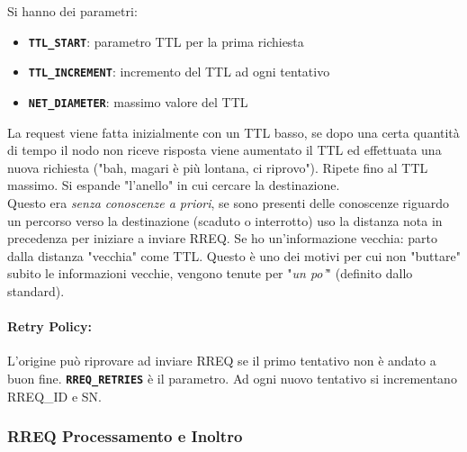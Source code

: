 Si hanno dei parametri:
\begin{itemize}
	\item \textbf{\texttt{TTL\_START}}: parametro TTL per la prima richiesta
	\item \textbf{\texttt{TTL\_INCREMENT}}: incremento del TTL ad ogni tentativo
	\item \texttt{\textbf{NET\_DIAMETER}}: massimo valore del TTL
\end{itemize}

La request viene fatta inizialmente con un TTL basso, se dopo una certa quantità di tempo il nodo non riceve risposta viene aumentato il TTL ed effettuata una nuova richiesta ("bah, magari è più lontana, ci riprovo"). Ripete fino al TTL massimo. Si espande "l'anello" in cui cercare la destinazione.\\

Questo era \textit{senza conoscenze a priori}, se sono presenti delle conoscenze riguardo un percorso verso la destinazione (scaduto o interrotto) uso la distanza nota in precedenza per iniziare a inviare RREQ. Se ho un'informazione vecchia: parto dalla distanza "vecchia" come TTL. Questo è uno dei motivi per cui non "buttare" subito le informazioni vecchie, vengono tenute per "\textit{un po'}" (definito dallo standard).\\

\paragraph{Retry Policy:} L'origine può riprovare ad inviare RREQ se il primo tentativo non è andato a buon fine. \texttt{\textbf{RREQ\_RETRIES}} è il parametro. Ad ogni nuovo tentativo si incrementano RREQ\_ID e SN.\\

\subsubsection{RREQ Processamento e Inoltro}

